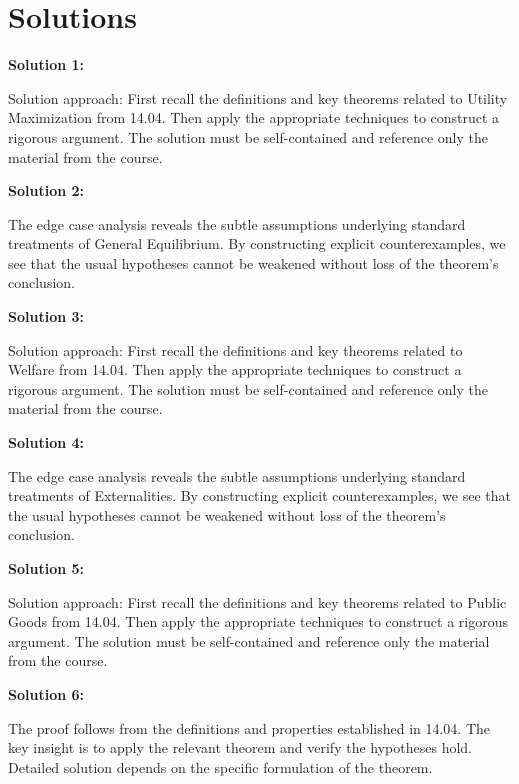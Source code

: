 \documentclass[12pt,a4paper]{exam}
\begin{document}
\newpage
\section*{Solutions}

\textbf{Solution 1:}

Solution approach: First recall the definitions and key theorems related to Utility Maximization from 14.04. Then apply the appropriate techniques to construct a rigorous argument. The solution must be self-contained and reference only the material from the course.

\vspace{0.5cm}

\textbf{Solution 2:}

The edge case analysis reveals the subtle assumptions underlying standard treatments of General Equilibrium. By constructing explicit counterexamples, we see that the usual hypotheses cannot be weakened without loss of the theorem's conclusion.

\vspace{0.5cm}

\textbf{Solution 3:}

Solution approach: First recall the definitions and key theorems related to Welfare from 14.04. Then apply the appropriate techniques to construct a rigorous argument. The solution must be self-contained and reference only the material from the course.

\vspace{0.5cm}

\textbf{Solution 4:}

The edge case analysis reveals the subtle assumptions underlying standard treatments of Externalities. By constructing explicit counterexamples, we see that the usual hypotheses cannot be weakened without loss of the theorem's conclusion.

\vspace{0.5cm}

\textbf{Solution 5:}

Solution approach: First recall the definitions and key theorems related to Public Goods from 14.04. Then apply the appropriate techniques to construct a rigorous argument. The solution must be self-contained and reference only the material from the course.

\vspace{0.5cm}

\textbf{Solution 6:}

The proof follows from the definitions and properties established in 14.04. The key insight is to apply the relevant theorem and verify the hypotheses hold. Detailed solution depends on the specific formulation of the theorem.
\end{document}
